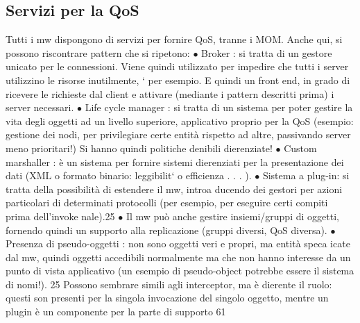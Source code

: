 \subsection{Servizi per la QoS}
Tutti i mw dispongono di servizi per fornire QoS, tranne i MOM. Anche qui, si
possono riscontrare pattern che si ripetono:
$\bullet$ Broker : si tratta di un gestore unicato per le connessioni. Viene quindi
utilizzato per impedire che tutti i server utilizzino le risorse inutilmente,
`
per esempio. E quindi un front end, in grado di ricevere le richieste dal
client e attivare (mediante i pattern descritti prima) i server necessari.
$\bullet$ Life cycle manager : si tratta di un sistema per poter gestire la vita degli
oggetti ad un livello superiore, applicativo proprio per la QoS (esempio:
gestione dei nodi, per privilegiare certe entità rispetto ad altre, passivando
server meno prioritari!) Si hanno quindi politiche denibili dierenziate!
$\bullet$ Custom marshaller : è un sistema per fornire sistemi dierenziati per la
presentazione dei dati (XML o formato binario: leggibilit` o efficienza
. . . ).
$\bullet$ Sistema a plug-in: si tratta della possibilità di estendere il mw, introa
ducendo dei gestori per azioni particolari di determinati protocolli (per
esempio, per eseguire certi compiti prima dell'invoke nale).25
$\bullet$ Il mw può anche gestire insiemi/gruppi di oggetti, fornendo quindi un
supporto alla replicazione (gruppi diversi, QoS diversa).
$\bullet$ Presenza di pseudo-oggetti : non sono oggetti veri e propri, ma entità speca
icate dal mw, quindi oggetti accedibili normalmente ma che non hanno
interesse da un punto di vista applicativo (un esempio di pseudo-object
potrebbe essere il sistema di nomi!).
25 Possono sembrare simili agli interceptor, ma è dierente il ruolo: questi son presenti per
la singola invocazione del singolo oggetto, mentre un plugin è un componente per la parte di
supporto
61